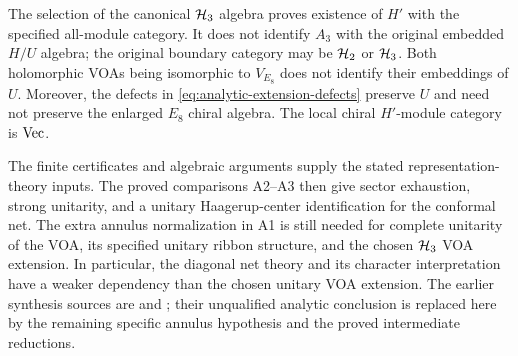 \begin{remark}
\label{rem:analytic-extension-scope}
The selection of the canonical $\HH_3$ algebra proves existence of
$H'$ with the specified all-module category.  It does not identify
$A_3$ with the original embedded $H/U$ algebra; the original boundary
category may be $\HH_2$ or $\HH_3$.  Both holomorphic VOAs being
isomorphic to $V_{E_8}$ does not identify their embeddings of $U$.
Moreover, the defects in \eqref{eq:analytic-extension-defects} preserve
$U$ and need not preserve the enlarged $E_8$ chiral algebra.
The local chiral $H'$-module category is $\Vec$.
\end{remark}

The finite certificates and algebraic arguments supply the stated
representation-theory inputs.  The proved comparisons A2--A3 then give
sector exhaustion, strong unitarity, and a unitary Haagerup-center
identification for the conformal net.  The extra annulus normalization
in A1 is still needed for complete unitarity of the VOA, its specified
unitary ribbon structure, and the chosen $\HH_3$ VOA extension.
In particular, the diagonal net theory and its character interpretation
have a weaker dependency than the chosen unitary VOA extension.
The earlier synthesis
sources are
 and
; their unqualified
analytic conclusion is replaced here by the remaining specific annulus
hypothesis and the proved intermediate reductions.
